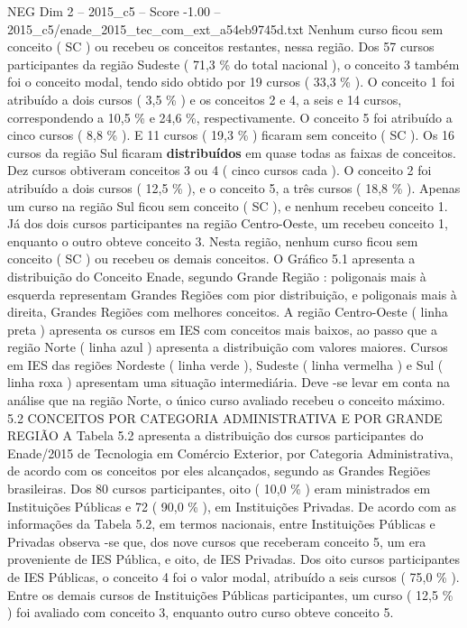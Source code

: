 \begin{textsample}{NEG Dim 2 – 2015\_c5 – Score -1.00 – 2015\_c5/enade\_2015\_tec\_com\_ext\_a54eb9745d.txt}
Nenhum curso ficou sem conceito ( SC ) ou recebeu os conceitos restantes, nessa região.
Dos 57 cursos participantes da região Sudeste ( 71,3 \% do total nacional ), o conceito 3 também foi o conceito modal, tendo sido obtido por 19 cursos ( 33,3 \% ).
O conceito 1 foi atribuído a dois cursos ( 3,5 \% ) e os conceitos 2 e 4, a seis e 14 cursos, correspondendo a 10,5 \% e 24,6 \%, respectivamente.
O conceito 5 foi atribuído a cinco cursos ( 8,8 \% ).
E 11 cursos ( 19,3 \% ) ficaram sem conceito ( SC ).
Os 16 cursos da região Sul ficaram \textbf{distribuídos} em quase todas as faixas de conceitos.
Dez cursos obtiveram conceitos 3 ou 4 ( cinco cursos cada ).
O conceito 2 foi atribuído a dois cursos ( 12,5 \% ), e o conceito 5, a três cursos ( 18,8 \% ).
Apenas um curso na região Sul ficou sem conceito ( SC ), e nenhum recebeu conceito 1.
Já dos dois cursos participantes na região Centro-Oeste, um recebeu conceito 1, enquanto o outro obteve conceito 3.
Nesta região, nenhum curso ficou sem conceito ( SC ) ou recebeu os demais conceitos.
O Gráfico 5.1 apresenta a distribuição do Conceito Enade, segundo Grande Região : poligonais mais à esquerda representam Grandes Regiões com pior distribuição, e poligonais mais à direita, Grandes Regiões com melhores conceitos.
A região Centro-Oeste ( linha preta ) apresenta os cursos em IES com conceitos mais baixos, ao passo que a região Norte ( linha azul ) apresenta a distribuição com valores maiores.
Cursos em IES das regiões Nordeste ( linha verde ), Sudeste ( linha vermelha ) e Sul ( linha roxa ) apresentam uma situação intermediária.
Deve -se levar em conta na análise que na região Norte, o único curso avaliado recebeu o conceito máximo. 5.2 CONCEITOS POR CATEGORIA ADMINISTRATIVA E POR GRANDE REGIÃO A Tabela 5.2 apresenta a distribuição dos cursos participantes do Enade/2015 de Tecnologia em Comércio Exterior, por Categoria Administrativa, de acordo com os conceitos por eles alcançados, segundo as Grandes Regiões brasileiras.
Dos 80 cursos participantes, oito ( 10,0 \% ) eram ministrados em Instituições Públicas e 72 ( 90,0 \% ), em Instituições Privadas.
De acordo com as informações da Tabela 5.2, em termos nacionais, entre Instituições Públicas e Privadas observa -se que, dos nove cursos que receberam conceito 5, um era proveniente de IES Pública, e oito, de IES Privadas.
Dos oito cursos participantes de IES Públicas, o conceito 4 foi o valor modal, atribuído a seis cursos ( 75,0 \% ).
Entre os demais cursos de Instituições Públicas participantes, um curso ( 12,5 \% ) foi avaliado com conceito 3, enquanto outro curso obteve conceito 5.

\end{textsample}
